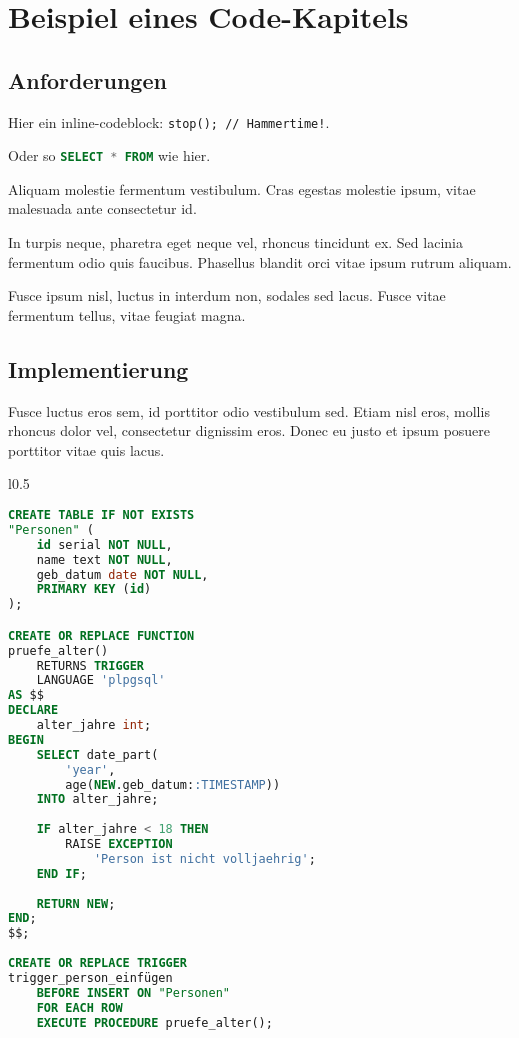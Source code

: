 \chapter{Beispiel eines Code-Kapitels}

\section{Anforderungen}

Hier ein inline-codeblock: \lstinline[language=pseudo]{stop(); // Hammertime!}.\cite{tuoski:2022}

Oder so \lstinline[language=sql]{SELECT * FROM} wie hier.



Aliquam molestie fermentum vestibulum. Cras egestas molestie ipsum, vitae malesuada ante consectetur id. 


In turpis neque, pharetra eget neque vel, rhoncus tincidunt ex. Sed lacinia fermentum odio quis faucibus. Phasellus blandit orci vitae ipsum rutrum aliquam. 


Fusce ipsum nisl, luctus in interdum non, sodales sed lacus. Fusce vitae fermentum tellus, vitae feugiat magna. 

\section{Implementierung}

Fusce luctus eros sem, id porttitor odio vestibulum sed. Etiam nisl eros, mollis rhoncus dolor vel, consectetur dignissim eros. Donec eu justo et ipsum posuere porttitor vitae quis lacus. 

\begin{wrapfigure}[26]{l}{0.5\linewidth}
\begin{lstlisting}[language=sql]
CREATE TABLE IF NOT EXISTS 
"Personen" (
    id serial NOT NULL,
    name text NOT NULL,
    geb_datum date NOT NULL,
    PRIMARY KEY (id)
);

CREATE OR REPLACE FUNCTION 
pruefe_alter()
    RETURNS TRIGGER
    LANGUAGE 'plpgsql'
AS $$
DECLARE
	alter_jahre int;
BEGIN
	SELECT date_part(
	    'year', 
	    age(NEW.geb_datum::TIMESTAMP))
	INTO alter_jahre;
	
	IF alter_jahre < 18 THEN
	    RAISE EXCEPTION 
	        'Person ist nicht volljaehrig';
	END IF;
	
	RETURN NEW;
END;
$$;
	
CREATE OR REPLACE TRIGGER 
trigger_person_einfügen
	BEFORE INSERT ON "Personen"
	FOR EACH ROW
	EXECUTE PROCEDURE pruefe_alter();
\end{lstlisting}
\captionsetup{type=figure}
\label{fig:trigger_example}
\end{wrapfigure}


